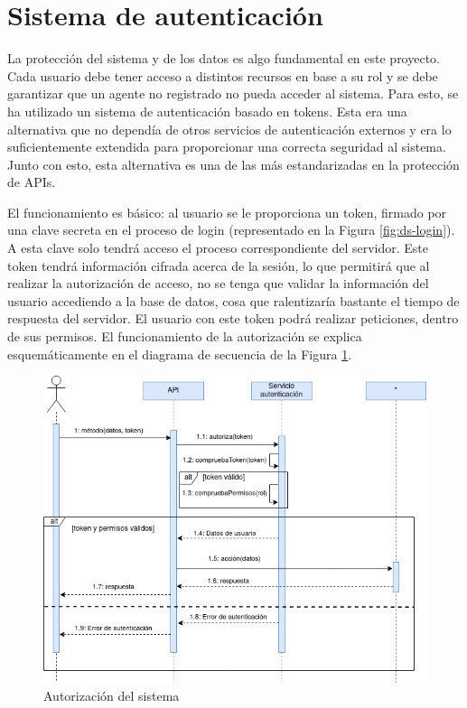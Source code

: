 \section{Sistema de autenticación}

La protección del sistema y de los datos es algo fundamental en este proyecto. Cada usuario debe tener acceso a distintos recursos en base a su rol y se debe garantizar que un agente no registrado no pueda acceder al sistema. Para esto, se ha utilizado un sistema de autenticación basado en tokens. Esta era una alternativa que no dependía de otros servicios de autenticación externos y era lo suficientemente extendida para proporcionar una correcta seguridad al sistema. Junto con esto, esta alternativa es una de las más estandarizadas en la protección de APIs.

El funcionamiento es básico: al usuario se le proporciona un token, firmado por una clave secreta en el proceso de login (representado en la Figura \ref{fig:ds-login}). A esta clave solo tendrá acceso el proceso correspondiente del servidor. Este token tendrá información cifrada acerca de la sesión, lo que permitirá que al realizar la autorización de acceso, no se tenga que validar la información del usuario accediendo a la base de datos, cosa que ralentizaría bastante el tiempo de respuesta del servidor. El usuario con este token podrá realizar peticiones, dentro de sus permisos. El funcionamiento de la autorización se explica esquemáticamente en el diagrama de secuencia de la Figura \ref{fig:ds-auth}.

\begin{figure}[]
    \centering
    \includegraphics[width=\textwidth]{diseno/sistema/DS/autorizacion.png}
    \caption{Autorización del sistema}
    \label{fig:ds-auth}
\end{figure}

